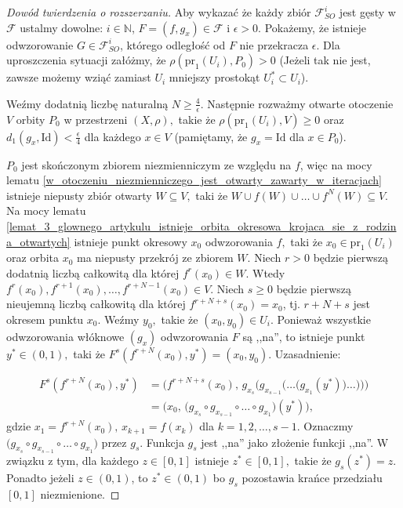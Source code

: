 \documentclass[licencjacka]{pwr_wmat_praca_dyplomowa}
\theoremstyle{plain}
\numberwithin{theorem}{chapter}
\theoremstyle{definition}
\numberwithin{theorem}{chapter}
\begin{document}
\begin{proof}[Dowód twierdzenia o rozszerzaniu]
Aby wykazać że każdy zbiór $\mathcal{F}_{SO}^i$ jest gęsty w $\mathcal{F}$ ustalmy dowolne: $i \in \mathbb{N}$, $F=(f,g_x) \in \mathcal{F}$ i $\epsilon > 0$. Pokażemy, że istnieje odwzorowanie $G \in \mathcal{F}_{SO}^i$, którego odległość od $F$ nie przekracza $\epsilon$. Dla uproszczenia sytuacji załóżmy, że $\rho(\textrm{pr}_1(U_i), P_0) > 0$ (Jeżeli tak nie jest, zawsze możemy wziąć zamiast $U_i$ mniejszy prostokąt $U_i^* \subset U_i$).

Weźmy dodatnią liczbę naturalną $N \geq \frac{4}{\epsilon}$. Następnie rozważmy otwarte otoczenie $V$ orbity $P_0$ w przestrzeni $(X, \rho),$ takie że $\rho(\textrm{pr}_1(U_i), V) \geq 0$ oraz $d_1(g_x, \textrm{Id}) < \frac{\epsilon}{4}$ dla każdego $x \in V$ (pamiętamy, że $g_x = \textrm{Id}$ dla $x \in P_0$).

$P_0$ jest skończonym zbiorem niezmienniczym ze względu na $f$, więc na mocy lematu \ref{w_otoczeniu_niezmienniczego_jest_otwarty_zawarty_w_iteracjach} istnieje niepusty zbiór otwarty $W \subseteq V,$ taki że $W \cup f(W) \cup \ldots \cup f^N(W) \subseteq V$. Na mocy lematu \ref{lemat_3_glownego_artykulu_istnieje_orbita_okresowa_krojaca_sie_z_rodzina_otwartych} istnieje punkt okresowy $x_0$ odwzorowania $f,$ taki że $x_0 \in \textrm{pr}_1(U_i)$ oraz orbita $x_0$ ma niepusty przekrój ze zbiorem $W$. Niech $r > 0$ będzie pierwszą dodatnią liczbą całkowitą dla której $f^r(x_0) \in W$. Wtedy $f^r(x_0), f^{r+1}(x_0), \ldots, f^{r+N-1}(x_0) \in V$. Niech $s \geq 0$ będzie pierwszą nieujemną liczbą całkowitą dla której $f^{r+N+s}(x_0) = x_0$, tj. $r+N+s$ jest okresem punktu $x_0$. Weźmy $y_0,$ takie że $(x_0, y_0) \in U_i$. Ponieważ wszystkie odwzorowania włóknowe $(g_x)$ odwzorowania $F$ są ,,na'', to istnieje punkt $y^* \in (0,1),$ taki że $F^s(f^{r+N}(x_0), y^*) = (x_0, y_0)$. Uzasadnienie:


\begin{equation}
\begin{aligned}
F^s(f^{r+N}(x_0), y^*) & = \Big( f^{r+N+s}(x_0), \, g_{x_s}\big(g_{x_{s-1}}\big( \ldots \big(g_{x_1}(y^*)\big) \ldots \big)\big) \Big) \\
& = \Big( x_0, \, \big(g_{x_s} \circ g_{x_{s-1}} \circ \ldots \circ g_{x_1} \big)(y^*) \Big),
\end{aligned}
\end{equation}
gdzie $x_1 = f^{r+N}(x_0), \, x_{k+1} = f(x_k)$ dla $k=1,2,\ldots,s-1.$
Oznaczmy  $\big(g_{x_s} \circ g_{x_{s-1}} \circ \ldots \circ g_{x_1} \big)$ przez $g_s.$ Funkcja $g_s$ jest ,,na'' jako złożenie funkcji ,,na''. W związku z tym, dla każdego $z \in [0,1]$ istnieje $z^* \in [0,1],$ takie że $g_s(z^*) = z.$ Ponadto jeżeli $z \in (0,1)$, to $z^* \in (0,1)$ bo $g_s$ pozostawia krańce przedziału $[0,1]$ niezmienione.




\end{proof}
\end{document}
